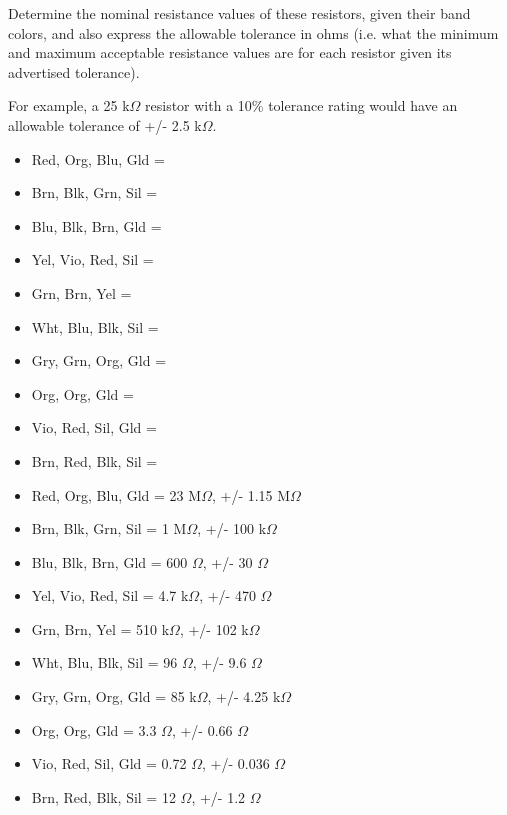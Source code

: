 

Determine the nominal resistance values of these resistors, given their band colors, and also express the allowable tolerance in ohms (i.e. what the minimum and maximum acceptable resistance values are for each resistor given its advertised tolerance). 

For example, a 25 k$\Omega$ resistor with a 10\% tolerance rating would have an allowable tolerance of +/- 2.5 k$\Omega$.

\begin{itemize}
\item{} Red, Org, Blu, Gld = 
\item{} Brn, Blk, Grn, Sil = 
\item{} Blu, Blk, Brn, Gld = 
\item{} Yel, Vio, Red, Sil = 
\item{} Grn, Brn, Yel =      
\item{} Wht, Blu, Blk, Sil =
\item{} Gry, Grn, Org, Gld =
\item{} Org, Org, Gld =
\item{} Vio, Red, Sil, Gld =
\item{} Brn, Red, Blk, Sil =
\end{itemize}







\begin{itemize}
\item{} Red, Org, Blu, Gld = 23 M$\Omega$, +/- 1.15 M$\Omega$
\item{} Brn, Blk, Grn, Sil = 1 M$\Omega$, +/- 100 k$\Omega$
\item{} Blu, Blk, Brn, Gld = 600 $\Omega$, +/- 30 $\Omega$
\item{} Yel, Vio, Red, Sil = 4.7 k$\Omega$, +/- 470 $\Omega$
\item{} Grn, Brn, Yel = 510 k$\Omega$, +/- 102 k$\Omega$
\item{} Wht, Blu, Blk, Sil = 96 $\Omega$, +/- 9.6 $\Omega$
\item{} Gry, Grn, Org, Gld = 85 k$\Omega$, +/- 4.25 k$\Omega$
\item{} Org, Org, Gld = 3.3 $\Omega$, +/- 0.66 $\Omega$
\item{} Vio, Red, Sil, Gld = 0.72 $\Omega$, +/- 0.036 $\Omega$
\item{} Brn, Red, Blk, Sil = 12 $\Omega$, +/- 1.2 $\Omega$
\end{itemize}


